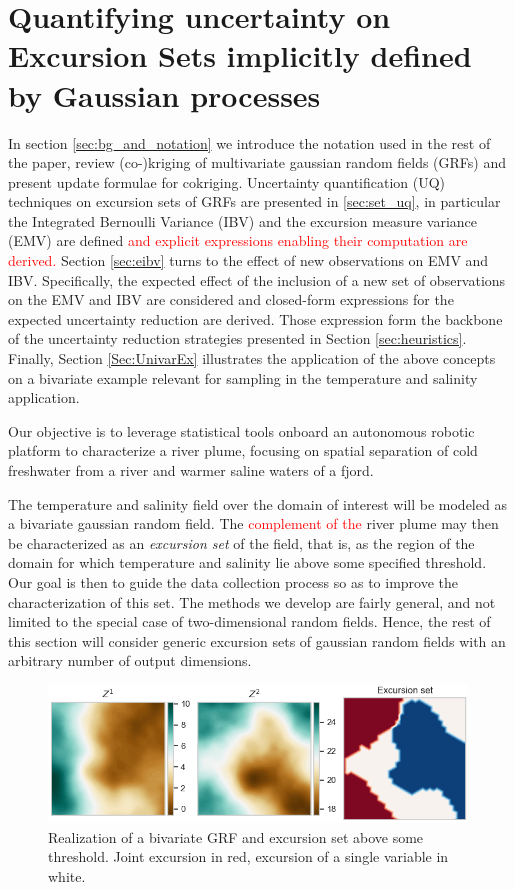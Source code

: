 \section{Quantifying uncertainty on Excursion Sets implicitly defined by Gaussian processes}
\label{sec:ESEP}

In section \ref{sec:bg_and_notation} we introduce the notation used in the rest of the paper, review (co-)kriging of multivariate gaussian random fields (GRFs) and present update formulae for cokriging.
Uncertainty quantification (UQ) techniques on excursion sets of GRFs are presented in \ref{sec:set_uq}, in particular the Integrated Bernoulli Variance (IBV) and the excursion measure variance (EMV) are defined \textcolor{red}{and explicit expressions enabling their computation are derived.}
Section \ref{sec:eibv} turns to the effect of new observations on EMV and IBV. Specifically, the expected effect of the 
inclusion of a new set of observations on the EMV and IBV are considered and closed-form expressions for the expected 
uncertainty reduction are derived. Those expression form the backbone of the uncertainty reduction strategies presented in
Section \ref{sec:heuristics}.
Finally, Section \ref{Sec:UnivarEx} illustrates the application of the above concepts on a bivariate example relevant for 
sampling in the temperature and salinity application.

\medskip

Our objective is to leverage statistical tools onboard an autonomous
robotic platform to characterize a river plume, focusing on spatial
separation of cold freshwater from a river and warmer saline waters
of a fjord.

The temperature and salinity field over the domain of interest will be modeled as a bivariate gaussian random field. The \textcolor{red}{complement of the} river plume may then be characterized as an \textit{excursion set} of the field, that is, as the region of the domain for which temperature and salinity lie above some specified threshold. Our goal is then to guide the data collection process so as to improve the characterization of this set.
The methods we develop are fairly general, and not limited to the special case of two-dimensional random fields. Hence, the rest of this section will consider generic excursion sets of gaussian random fields with an arbitrary number of output dimensions.

\begin{figure}[h!] \centering
  \includegraphics[width=0.99\textwidth]{Figures/example_excu_1.png}
  \caption{Realization of a bivariate GRF and excursion set above some threshold. Joint excursion in red, excursion of a single variable in white.}
\label{example_excu}
\end{figure}


